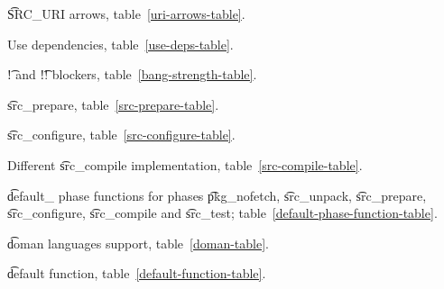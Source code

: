 \begin{compactitem}
\item \t{SRC\_URI} arrows, table~\ref{uri-arrows-table}.
\item Use dependencies, table~\ref{use-deps-table}.
\item \t{!} and \t{!!} blockers, table~\ref{bang-strength-table}.
\item \t{src\_prepare}, table~\ref{src-prepare-table}.
\item \t{src\_configure}, table~\ref{src-configure-table}.
\item Different \t{src\_compile} implementation, table~\ref{src-compile-table}.
\item \t{default\_} phase functions for phases \t{pkg\_nofetch}, \t{src\_unpack}, \t{src\_prepare},
    \t{src\_configure}, \t{src\_compile} and \t{src\_test}; table~\ref{default-phase-function-table}.
\item \t{doman} languages support, table~\ref{doman-table}.
\item \t{default} function, table~\ref{default-function-table}.
\end{compactitem}


